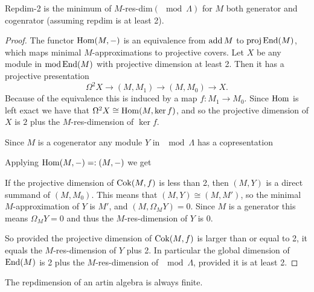 \begin{prop}
	Repdim-2 is the minimum of $M$-res-dim$(\mod \Lambda)$ for $M$ both generator and cogenrator (assuming repdim is at least 2).
	
	\begin{proof}
		The functor $\operatorname{Hom}(M, -)$ is an equivalence from $\operatorname{add} M$ to $\operatorname{proj}\operatorname{End}(M)$, which maps minimal $M$-approximations to projective covers. Let $X$ be any module in $\operatorname{mod}\operatorname{End}(M)$ with projective dimension at least 2. Then it has a projective presentation $$\Omega^2X \to (M,M_1) \to (M,M_0) \to X.$$
		Because of the equivalence this is induced by a map $f\colon M_1\to M_0$. Since $\operatorname{Hom}$ is left exact we have that $\Omega^2X \cong \operatorname{Hom}(M, \ker f)$, and so the projective dimension of $X$ is $2$ plus the $M$-res-dimension of $\ker f$.
		
		Since $M$ is a cogenerator any module $Y$ in $\mod\Lambda$ has a copresentation 
		\begin{center}
		\end{center}
		Applying $\operatorname{Hom}(M,-) =: (M,-)$ we get
		\begin{center}
		\end{center}
		If the projective dimension of $\operatorname{Cok}(M,f)$ is less than 2, then $(M, Y)$ is a direct summand of $(M, M_0)$. This means that $(M,Y) \cong (M, M')$, so the minimal $M$-approximation of $Y$ is $M'$, and $(M, \Omega_M Y) = 0$. Since $M$ is a generator this means $\Omega_M Y = 0$ and thus the $M$-res-dimension of $Y$ is 0.
		
		So provided the projective dimension of $\operatorname{Cok}(M,f)$ is larger than or equal to 2, it equals the $M$-res-dimension of $Y$ plus 2. In particular the global dimension of $\operatorname{End}(M)$ is 2 plus the $M$-res-dimension of $\mod\Lambda$, provided it is at least 2.
	\end{proof}
\end{prop}

\begin{prop}
	The repdimension of an artin algebra is always finite. \cite{Iya02}
\end{prop}

